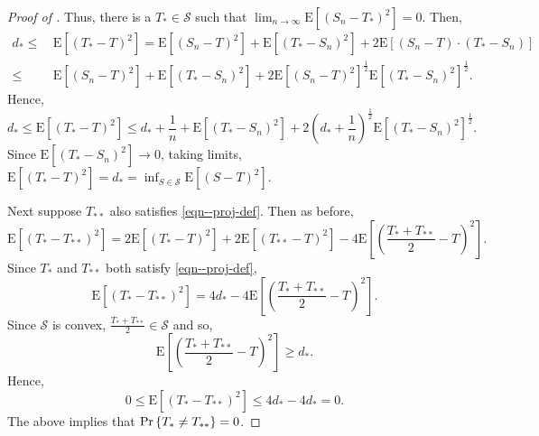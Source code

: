 \documentclass[12pt]{article}
\def\Pr{\mathop{\rm Pr}\nolimits}
\numberwithin{equation}{section}
\theoremstyle{definition}
\theoremstyle{plain}
\begin{document}
\begin{proof}[Proof of ]
Thus, there is a \(T_{\ast} \in \mathcal{S}\) such that
\(\lim_{n \to \infty} \mathrm{E} \left[ \left( S_{n} - T_{\ast} \right)^{2}
\right] = 0\).
Then,
\begin{align*}
  d_{\ast} \leq
  & \, \mathrm{E} \left[ \left( T_{\ast} - T \right)^{2} \right]
  =
  \mathrm{E} \left[ \left( S_{n} - T \right)^{2} \right] + \mathrm{E} \left[
  \left( T_{\ast} - S_{n} \right)^{2} \right] + 2 \mathrm{E} \left[ \left( S_{n}
  - T \right) \cdot \left( T_{\ast} - S_{n} \right) \right] \\
  \leq
  & \, \mathrm{E} \left[ \left( S_{n} - T \right)^{2} \right] + \mathrm{E}
  \left[ \left( T_{\ast} - S_{n} \right)^{2} \right] + 2 \mathrm{E} \left[
  \left( S_{n} - T \right)^{2} \right]^{\frac{1}{2}} \mathrm{E} \left[ \left(
  T_{\ast} - S_{n} \right)^{2} \right]^{\frac{1}{2}}.
\end{align*}
Hence,
\begin{equation*}
  d_{\ast} \leq \mathrm{E} \left[ \left( T_{\ast} - T \right)^{2} \right] \leq
  d_{\ast} + \frac{1}{n} + \mathrm{E} \left[ \left( T_{\ast}
  - S_{n} \right)^{2} \right] + 2 \left( d_{\ast} + \frac{1}{n}
  \right)^{\frac{1}{2}} \mathrm{E} \left[ \left( T_{\ast} - S_{n} \right)^{2}
  \right]^{\frac{1}{2}}.
\end{equation*}
Since \(\mathrm{E} \left[ \left( T_{\ast} - S_{n} \right)^{2} \right] \to 0\),
taking limits,
\(\mathrm{E} \left[ \left( T_{\ast} - T \right)^{2} \right] = d_{\ast} = \inf_{S
\in \mathcal{S}} \mathrm{E} \left[ \left( S - T \right)^{2} \right]\).

Next suppose \(T_{\ast \ast}\) also satisfies \eqref{eqn--proj-def}.
Then as before,
\begin{equation*}
  \mathrm{E} \left[ \left( T_{\ast} - T_{\ast \ast} \right)^{2} \right] =
  2 \mathrm{E} \left[ \left( T_{\ast} - T \right)^{2} \right] + 2 \mathrm{E}
  \left[ \left( T_{\ast \ast} - T \right)^{2} \right] - 4 \mathrm{E} \left[
  \left( \frac{T_{\ast} + T_{\ast \ast}}{2} - T \right)^{2} \right].
\end{equation*}
Since \(T_{\ast}\) and \(T_{\ast \ast}\) both satisfy \eqref{eqn--proj-def},
\begin{equation*}
  \mathrm{E} \left[ \left( T_{\ast} - T_{\ast \ast} \right)^{2} \right] =
  4 d_{\ast} - 4 \mathrm{E} \left[ \left( \frac{T_{\ast} + T_{\ast \ast}}{2} - T
  \right)^{2} \right].
\end{equation*}
Since \(\mathcal{S}\) is convex, \(\frac{T_{\ast} + T_{\ast \ast}}{2} \in
\mathcal{S}\) and so,
\begin{equation*}
  \mathrm{E} \left[ \left( \frac{T_{\ast} + T_{\ast \ast}}{2} - T
  \right)^{2} \right] \geq d_{\ast}.
\end{equation*}
Hence,
\begin{equation*}
  0 \leq \mathrm{E} \left[ \left( T_{\ast} - T_{\ast \ast} \right)^{2} \right]
  \leq 4 d_{\ast} - 4 d_{\ast} = 0.
\end{equation*}
The above implies that \(\Pr \left\{T_{\ast} \neq T_{\ast \ast} \right\} = 0\).
\end{proof}
\end{document}

